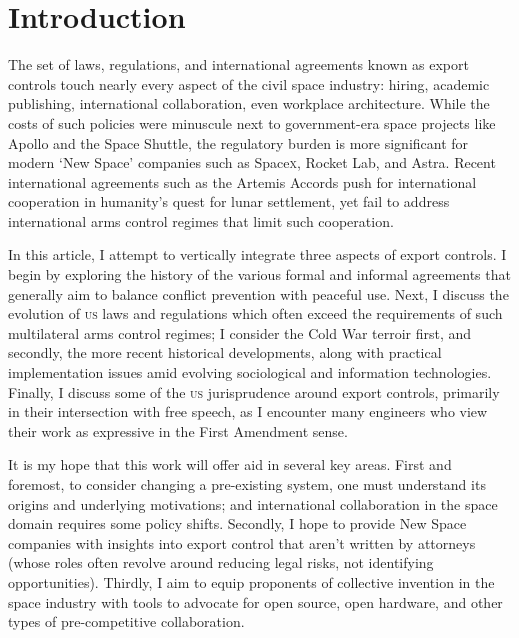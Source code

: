 \documentclass[preprint,twocolumn,5p]{elsarticle}
\begin{document}
\maketitle

\section{Introduction}
The set of laws, regulations, and international agreements known as export controls touch nearly every aspect of the civil space industry: hiring, academic publishing, international collaboration, even workplace architecture. While the costs of such policies were minuscule next to government-era space projects like Apollo and the Space Shuttle, the regulatory burden is more significant for modern `New Space' companies such as Space\textsc{x}, Rocket Lab, and Astra. Recent international agreements such as the Artemis Accords push for international cooperation in humanity's quest for lunar settlement, yet fail to address international arms control regimes that limit such cooperation.

In this article, I attempt to vertically integrate three aspects of export controls. I begin by exploring the history of the various formal and informal agreements that generally aim to balance conflict prevention with peaceful use. Next, I discuss the evolution of \textsc{us} laws and regulations which often exceed the requirements of such multilateral arms control regimes; I consider the Cold War terroir first, and secondly, the more recent historical developments, along with practical implementation issues amid evolving sociological and information technologies. Finally, I discuss some of the \textsc{us} jurisprudence around export controls, primarily in their intersection with free speech, as I encounter many engineers who view their work as expressive in the First Amendment sense.

It is my hope that this work will offer aid in several key areas. First and foremost, to consider changing a pre-existing system, one must understand its origins and underlying motivations; and international collaboration in the space domain requires some policy shifts. Secondly, I hope to provide New Space companies with insights into export control that aren't written by attorneys (whose roles often revolve around reducing legal risks, not identifying opportunities). Thirdly, I aim to equip proponents of collective invention in the space industry with tools to advocate for open source, open hardware, and other types of pre-competitive collaboration.
\end{document}
